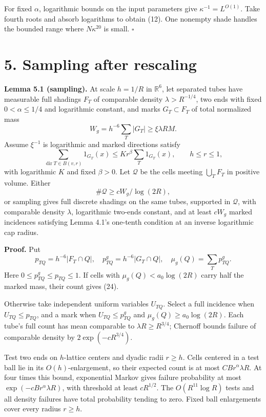 \documentclass[
  11pt,
  a4paper,
]{article}
\begin{document}
For fixed \(\alpha\), logarithmic bounds on the input parameters give
\(\kappa^{-1}=L^{O(1)}\). Take fourth roots and absorb logarithms to
obtain (12). One nonempty shade handles the bounded range where
\(N\kappa^{20}\) is small. \(\square\)

\hypertarget{sampling-after-rescaling}{%
\section{5. Sampling after rescaling}\label{sampling-after-rescaling}}

\textbf{Lemma 5.1 (sampling).} At scale \(h=1/R\) in \(\mathbb R^6\),
let separated tubes have measurable full shadings \(F_T\) of comparable
density \(\lambda>R^{-1/4}\), two ends with fixed \(0<\alpha\le1/4\) and
logarithmic constant, and marks \(G_T\subset F_T\) of total normalized
mass \[
 W_g=h^{-6}\sum_T|G_T|\ge \xi\lambda RM.
\] Assume \(\xi^{-1}\) is logarithmic and marked directions satisfy \[
 \sum_{\operatorname{dir}T\in B(v,r)}1_{G_T}(x)
 \le Kr^\beta\sum_T1_{G_T}(x),\qquad h\le r\le1,
\tag{23}\label{eq:23}
\] with logarithmic \(K\) and fixed \(\beta>0\). Let \(\mathcal Q\) be
the cells meeting \(\bigcup_TF_T\) in positive volume. Either \[
 \#\mathcal Q\ge cW_g/\log(2R),
\tag{24}\label{eq:24}
\] or sampling gives full discrete shadings on the same tubes, supported
in \(\mathcal Q\), with comparable density \(\lambda\), logarithmic
two-ends constant, and at least \(cW_g\) marked incidences satisfying
Lemma 4.1's one-tenth condition at an inverse logarithmic cap radius.

\textbf{Proof.} Put \[
 p_{TQ}=h^{-6}|F_T\cap Q|,\quad
 p^g_{TQ}=h^{-6}|G_T\cap Q|,\quad
 \mu_g(Q)=\sum_Tp^g_{TQ}.
\] Here \(0\le p^g_{TQ}\le p_{TQ}\le1\). If cells with
\(\mu_g(Q)<a_0\log(2R)\) carry half the marked mass, their count gives
(24).

Otherwise take independent uniform variables \(U_{TQ}\). Select a full
incidence when \(U_{TQ}\le p_{TQ}\), and a mark when
\(U_{TQ}\le p^g_{TQ}\) and \(\mu_g(Q)\ge a_0\log(2R)\). Each tube's full
count has mean comparable to \(\lambda R\ge R^{3/4}\); Chernoff bounds
failure of comparable density by \(2\exp(-cR^{3/4})\).

Test two ends on \(h\)-lattice centers and dyadic radii \(r\ge h\).
Cells centered in a test ball lie in its \(O(h)\)-enlargement, so their
expected count is at most \(CB r^\alpha\lambda R\). At four times this
bound, exponential Markov gives failure probability at most
\(\exp(-cB r^\alpha\lambda R)\), with threshold at least \(cR^{1/2}\).
The \(O(R^{11}\log R)\) tests and all density failures have total
probability tending to zero. Fixed ball enlargements cover every radius
\(r\ge h\).
\end{document}
